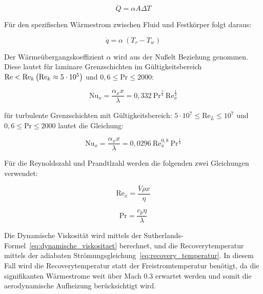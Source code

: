 \begin{equation}
    \dot{Q}=\alpha A \Delta T 
\end{equation}

Für den spezifischen Wärmestrom zwischen Fluid und Festkörper folgt daraus:

\begin{equation}
  \label{eq:qdot}
  \dot{q} = \alpha \ (T_r - T_w)
\end{equation}

Der Wärmeübergangskoeffizient $\alpha$ wird aus der Nußelt Beziehung genommen. Diese lautet
für laminare Grenzschichten im Gültigkeitsbereich $\text{Re} < \text{Re}_k\\\left(\text{Re}_k \approx 5 \cdot 10^5\right)$ und $0,6 \leq \text{Pr} \leq 2000$:

\begin{equation}
  \label{eq:nusselt_laminar}
  \text{Nu}_x = \frac{\alpha_x x}{\lambda} = 0,332 \ \text{Pr}^{\frac{1}{3}} \ \text{Re}_x^{\frac{1}{2}}
\end{equation}

für turbulente Grenzschichten mit Gültigkeitsbereich: $5 \cdot 10^7 \leq \text{Re}_L \leq 10^7$ und $ 0,6 \leq \text{Pr} \leq 2000$ lautet die Gleichung:

\begin{equation}
  \label{eq:nusselt_turbulent}
  \text{Nu}_x = \frac{\alpha_x x}{\lambda} = 0,0296 \ \text{Re}_x^{0,8} \ \text{Pr}^{\frac{1}{3}}
\end{equation}

Für die Reynoldszahl und Prandtlzahl werden die folgenden zwei Gleichungen verwendet:
\newline
\noindent\begin{minipage}{.5\linewidth}
  \begin{equation}
    \label{eq:reynolds}
    \text{Re}_x = \frac{V \rho x}{\eta}
  \end{equation}
\end{minipage}%
\begin{minipage}{.5\linewidth}
  \begin{equation}
    \label{eq:prandtl}
    \text{Pr} = \frac{c_p \eta}{\lambda}
  \end{equation}
\end{minipage}

Die Dynamische Viskosität wird mittels der Sutherlands-Formel~\ref{eq:dynamische_viskositaet} berechnet, und die Recoverytemperatur mittels der adiabaten Strömungsgleichung~\ref{eq:recovery_temperatur}.
In diesem Fall wird die Recoverytemperatur statt der Freistromtemperatur benötigt, da die signifikanten Wärmestrome weit über Mach 0.3 erwartet werden und somit die aerodynamische
Aufheizung berücksichtigt wird.

